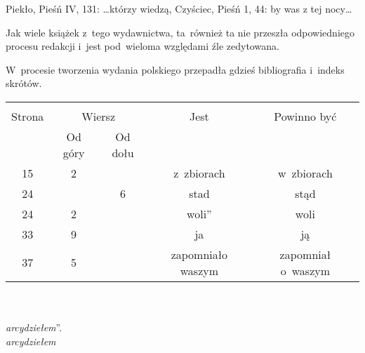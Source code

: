 \documentclass[a4paper,11pt]{article}
\begin{document}
Piekło, Pieśń IV, 131: \ldots którzy wiedzą, Czyściec, Pieśń 1, 44: by
was z tej nocy\ldots


\vspace{\spaceTwo}







\vspace{\spaceTwo} %






\start Jak wiele książek z~tego wydawnictwa, ta~również ta nie
przeszła odpowiedniego procesu redakcji i~jest pod~wieloma względami
źle zedytowana.

\vspace{\spaceFour}


\start W~procesie tworzenia wydania polskiego przepadła gdzieś
bibliografia i~indeks skrótów.

\begin{center}
  \begin{tabular}{|c|c|c|c|c|}
    \hline
    & \multicolumn{2}{c|}{} & & \\
    Strona & \multicolumn{2}{c|}{Wiersz} & Jest
                              & Powinno być \\ \cline{2-3}
    & Od góry & Od dołu & & \\
    \hline
    15  &  2 & & z~zbiorach & w~zbiorach \\
    24  & &  6 & stad & stąd \\
    24  &  2 & & woli'' & woli \\
    33  &  9 & & ja & ją \\
    37  &  5 & & zapomniało waszym & zapomniał o~waszym \\
    \hline
  \end{tabular}
\end{center}
\noindent\\
 \\
\Jest \emph{arcydziełem}''. \\
\Pow \emph{arcydziełem} \\
\end{document}
